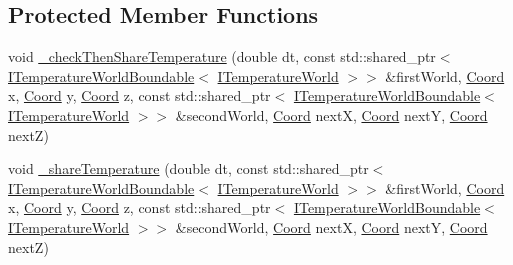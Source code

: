 \subsection*{Protected Member Functions}
\begin{DoxyCompactItemize}
\item 
void \hyperlink{class_average_share_temperature_world_updater_ad117315f70e5a2e214547dbf789715f8}{\-\_\-check\-Then\-Share\-Temperature} (double dt, const std\-::shared\-\_\-ptr$<$ \hyperlink{class_i_temperature_world_boundable}{I\-Temperature\-World\-Boundable}$<$ \hyperlink{class_i_temperature_world}{I\-Temperature\-World} $>$$>$ \&first\-World, \hyperlink{struct_coord}{Coord} x, \hyperlink{struct_coord}{Coord} y, \hyperlink{struct_coord}{Coord} z, const std\-::shared\-\_\-ptr$<$ \hyperlink{class_i_temperature_world_boundable}{I\-Temperature\-World\-Boundable}$<$ \hyperlink{class_i_temperature_world}{I\-Temperature\-World} $>$$>$ \&second\-World, \hyperlink{struct_coord}{Coord} next\-X, \hyperlink{struct_coord}{Coord} next\-Y, \hyperlink{struct_coord}{Coord} next\-Z)
\item 
void \hyperlink{class_average_share_temperature_world_updater_ab5fe8bcd2311e4af0b4a09d5f3d7b8d9}{\-\_\-share\-Temperature} (double dt, const std\-::shared\-\_\-ptr$<$ \hyperlink{class_i_temperature_world_boundable}{I\-Temperature\-World\-Boundable}$<$ \hyperlink{class_i_temperature_world}{I\-Temperature\-World} $>$$>$ \&first\-World, \hyperlink{struct_coord}{Coord} x, \hyperlink{struct_coord}{Coord} y, \hyperlink{struct_coord}{Coord} z, const std\-::shared\-\_\-ptr$<$ \hyperlink{class_i_temperature_world_boundable}{I\-Temperature\-World\-Boundable}$<$ \hyperlink{class_i_temperature_world}{I\-Temperature\-World} $>$$>$ \&second\-World, \hyperlink{struct_coord}{Coord} next\-X, \hyperlink{struct_coord}{Coord} next\-Y, \hyperlink{struct_coord}{Coord} next\-Z)
\end{DoxyCompactItemize}
